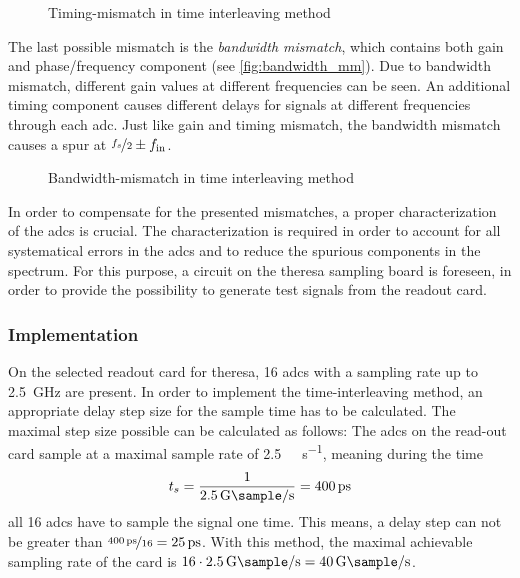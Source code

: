 \begin{figure}[H]
	\centering
	\resizebox{1\textwidth}{!}{}
	\caption{Timing-mismatch in time interleaving method \cite{Harris2019}}
	\label{fig:timing_mm}
\end{figure}

The last possible mismatch is the \textit{bandwidth mismatch}, which contains both gain and phase/frequency component (see \autoref{fig:bandwidth_mm}). 
Due to bandwidth mismatch, different gain values at different frequencies can be seen. 
An additional timing component causes different delays for signals at different frequencies through each \gls{adc}. 
Just like gain and timing mismatch, the bandwidth mismatch causes a spur at $\nicefrac{f_s}{2} \pm f_\text{in}$.

\begin{figure}[H]
	\centering
	\resizebox{1\textwidth}{!}{}
	\caption{Bandwidth-mismatch in time interleaving method \cite{Harris2019}}
	\label{fig:bandwidth_mm}
\end{figure}

In order to compensate for the presented mismatches, a proper characterization of the \glspl{adc} is crucial. 
The characterization is required in order to account for all systematical errors in the \glspl{adc} and to reduce the spurious components in the spectrum.
For this purpose, a circuit on the \gls{theresa} sampling board is foreseen, in order to provide the possibility to generate test signals from the readout card.

\subsubsection{Implementation}\label{ssec:interl_impl}
On the selected readout card for \gls{theresa}, 16 \glspl{adc} with a sampling rate up to \SI{2.5}{\GHz} are present.
In order to implement the time-interleaving method, an appropriate delay step size for the sample time has to be calculated.
The maximal step size possible can be calculated as follows: 
The \glspl{adc} on the read-out card sample at a maximal sample rate of \SI{2.5}{\giga\sample\per\second}, meaning during the time
\begin{equation}
	t_s = \frac{1}{\SI{2.5}{\giga \sample \per \second}} = \SI{400}{\pico \second}
\end{equation}
all 16 \glspl{adc} have to sample the signal one time.
This means, a delay step can not be greater than $\nicefrac{\SI{400}{\pico\second}}{16} = \SI{25}{\pico\second}$.
With this method, the maximal achievable sampling rate of the card is $16 \cdot \SI{2.5}{\giga\sample\per\second}  = \SI{40}{\giga\sample\per\second}$. 

